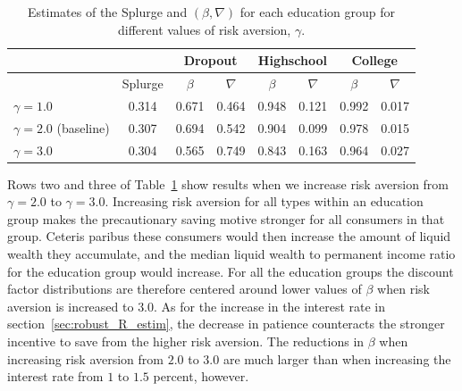 \documentclass[../HAFiscal]{subfiles}
\begin{document}
\begin{table}[t]
\begin{center}
\begin{tabular}{lc|cccccc} 
	\toprule
	& & \multicolumn{2}{c}{Dropout} & \multicolumn{2}{c}{Highschool} & \multicolumn{2}{c}{College} \\ \midrule 
	& Splurge & $\beta$ & $\nabla$ & $\beta$ & $\nabla$ & $\beta$ & $\nabla$ \\ \midrule 
	$\gamma = 1.0$ & 0.314 & 0.671 & 0.464 & 0.948 & 0.121 & 0.992 & 0.017 \\ 
	$\gamma = 2.0$ (baseline) & 0.307 & 0.694 & 0.542 & 0.904 & 0.099 & 0.978 & 0.015 \\
	$\gamma = 3.0$ & 0.304 & 0.565 & 0.749 & 0.843 & 0.163 & 0.964 & 0.027 
	\\ \bottomrule 
\end{tabular}
\caption{Estimates of the Splurge and $(\beta,\nabla)$ for each education group for different values of risk aversion, $\gamma$.}
\label{tab:robustness_gamma}
\end{center}
\end{table}

Rows two and three of Table~\ref{tab:robustness_gamma} show results when we increase risk aversion from $\gamma=2.0$ to $\gamma=3.0$. Increasing risk aversion for all types within an education group makes the precautionary saving motive stronger for all consumers in that group. Ceteris paribus these consumers would then increase the amount of liquid wealth they accumulate, and the median liquid wealth to permanent income ratio for the education group would increase. For all the education groups the discount factor distributions are therefore centered around lower values of $\beta$ when risk aversion is increased to $3.0$. As for the increase in the interest rate in section~\ref{sec:robust_R_estim}, the decrease in patience counteracts the stronger incentive to save from the higher risk aversion. The reductions in $\beta$ when increasing risk aversion from $2.0$ to $3.0$ are much larger than when increasing the interest rate from $1$ to $1.5$ percent, however. 
\end{document}
